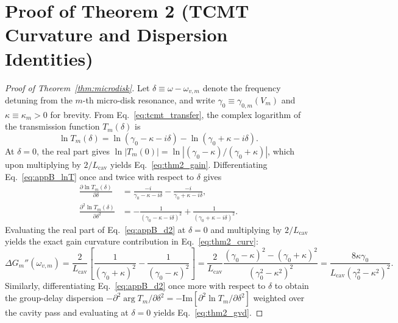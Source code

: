 \documentclass[11pt,letterpaper]{article}
\begin{document}
\section{Proof of Theorem 2 (TCMT Curvature and Dispersion Identities)}
\label{app:proof_thm2}

\begin{proof}[Proof of Theorem~\ref{thm:microdisk}]
Let $\delta \equiv \omega - \omega_{v,m}$ denote the frequency detuning from the $m$-th micro-disk resonance, and write $\gamma_0 \equiv \gamma_{0,m}(V_m)$ and $\kappa \equiv \kappa_m > 0$ for brevity. From Eq.~\eqref{eq:tcmt_transfer}, the complex logarithm of the transmission function $T_m(\delta)$ is
\begin{equation}
\ln T_m(\delta) = \ln(\gamma_0 - \kappa - i\delta) - \ln(\gamma_0 + \kappa - i\delta).
\label{eq:appB_lnT}
\end{equation}
At $\delta = 0$, the real part gives $\ln |T_m(0)| = \ln |(\gamma_0 - \kappa)/(\gamma_0 + \kappa)|$, which upon multiplying by $2/L_{\mathrm{cav}}$ yields Eq.~\eqref{eq:thm2_gain}. Differentiating Eq.~\eqref{eq:appB_lnT} once and twice with respect to $\delta$ gives
\begin{align}
\frac{\partial \ln T_m(\delta)}{\partial \delta} &= \frac{-i}{\gamma_0 - \kappa - i\delta} - \frac{-i}{\gamma_0 + \kappa - i\delta}, \label{eq:appB_d1}\\
\frac{\partial^2 \ln T_m(\delta)}{\partial \delta^2} &= -\frac{1}{(\gamma_0 - \kappa - i\delta)^2} + \frac{1}{(\gamma_0 + \kappa - i\delta)^2}. \label{eq:appB_d2}
\end{align}
Evaluating the real part of Eq.~\eqref{eq:appB_d2} at $\delta = 0$ and multiplying by $2/L_{\mathrm{cav}}$ yields the exact gain curvature contribution in Eq.~\eqref{eq:thm2_curv}:
\begin{equation}
\Delta G_m''(\omega_{v,m}) = \frac{2}{L_{\mathrm{cav}}}\left[ \frac{1}{(\gamma_0 + \kappa)^2} - \frac{1}{(\gamma_0 - \kappa)^2} \right] = \frac{2}{L_{\mathrm{cav}}}\frac{(\gamma_0 - \kappa)^2 - (\gamma_0 + \kappa)^2}{(\gamma_0^2 - \kappa^2)^2} = \frac{8\kappa \gamma_0}{L_{\mathrm{cav}}(\gamma_0^2 - \kappa^2)^2}.
\label{eq:appB_curv_proof}
\end{equation}
Similarly, differentiating Eq.~\eqref{eq:appB_d2} once more with respect to $\delta$ to obtain the group-delay dispersion $-\partial^2 \arg T_m/\partial\delta^2 = -\mathrm{Im}[\partial^2 \ln T_m/\partial\delta^2]$ weighted over the cavity pass and evaluating at $\delta = 0$ yields Eq.~\eqref{eq:thm2_gvd}.


\end{proof}
\end{document}
